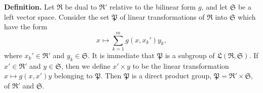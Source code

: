 \textbf{Definition.} Let $\mathfrak{R}$ be dual to $\mathfrak{R}'$ relative to the bilinear form $g$, and let $\mathfrak{S}$ be a left vector space. Consider the set $\mathfrak{P}$ of linear transformations of $\mathfrak{R}$ into $\mathfrak{S}$ which have the form
$$x \mapsto \sum_{k=1}^{m} g(x, x_k')y_k,$$
where $x_k' \in \mathfrak{R}'$ and $y_k \in \mathfrak{S}$. It is immediate that $\mathfrak{P}$ is a subgroup of $\mathfrak{L}(\mathfrak{R}, \mathfrak{S})$. If $x' \in \mathfrak{R}'$ and $y \in \mathfrak{S}$, then we define $x' \times y$ to be the linear transformation $x \mapsto g(x, x')y$ belonging to $\mathfrak{P}$. Then $\mathfrak{P}$ is a direct product group, $\mathfrak{P} = \mathfrak{R}' \times \mathfrak{S}$, of $\mathfrak{R}'$ and $\mathfrak{S}$.
